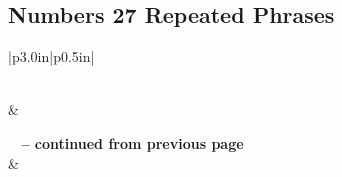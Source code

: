 \subsection{Numbers 27 Repeated Phrases}


\normalsize
 
\begin{center}
\begin{longtable}{|p{3.0in}|p{0.5in}|}
\caption[Numbers 27 Repeated Phrases]{Numbers 27 Repeated Phrases}\label{table:Repeated Phrases Numbers 27} \\
\hline {} &  \\ \hline 
\endfirsthead
 
{{\bfseries \tablename\ \thetable{} -- continued from previous page}} \\  
\hline {} &  \\ \hline 
\endhead
 

\end{longtable}
\end{center}
